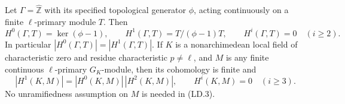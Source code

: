 \begin{proposition}
\label{prop:ld-procyclic}
Let $\Gamma=\widehat{\mathbb Z}$ with its specified topological generator
$\phi$, acting continuously on a finite $\ell$-primary module $T$.  Then
\[
 H^0(\Gamma,T)=\ker(\phi-1),\qquad
 H^1(\Gamma,T)=T/(\phi-1)T,\qquad
 H^i(\Gamma,T)=0\quad(i\ge2).
 \tag{LD.2}
\]
In particular $|H^0(\Gamma,T)|=|H^1(\Gamma,T)|$.
If $K$ is a nonarchimedean local field of characteristic zero and
residue characteristic $p\ne\ell$, and $M$ is any finite continuous
$\ell$-primary $G_K$-module, then its cohomology is finite and
\[
 |H^1(K,M)|=|H^0(K,M)|\,|H^2(K,M)|,
 \qquad H^i(K,M)=0\quad(i\ge3).
 \tag{LD.3}
\]
No unramifiedness assumption on $M$ is needed in (LD.3).
\end{proposition}

